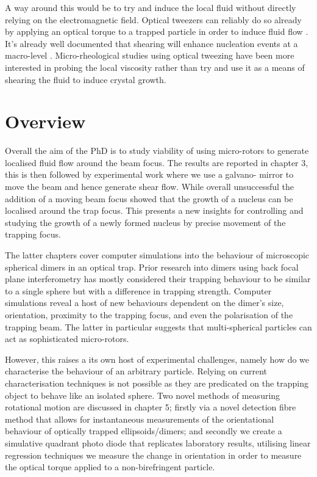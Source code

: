A way around this would be to try and induce the local fluid 
without directly relying on the electromagnetic field. Optical 
tweezers can reliably do so already by applying an optical 
torque to a trapped particle in order to induce fluid flow 
\cite{Bishop2004, RobertsonAnderson2018}. It's already well
documented that shearing will enhance nucleation events at a
macro-level \cite{Debuysschere2023}. Micro-rheological studies 
using optical tweezing have been more interested in probing 
the local viscosity rather than try and use it as a means of 
shearing the fluid to induce crystal growth. 

\section{Overview}
Overall the aim of the PhD is to study viability of using 
micro-rotors to generate localised fluid flow around the 
beam focus. The results are reported in chapter 3, this is 
then followed by experimental work where we use a galvano-
mirror to move the beam and hence generate shear flow. While 
overall unsuccessful the addition of a moving beam focus 
showed that the growth of a nucleus can be localised around 
the trap focus. This presents a new insights for controlling 
and studying the growth of a newly formed nucleus by precise 
movement of the trapping focus.

The latter chapters cover computer simulations into the 
behaviour of microscopic spherical dimers in an optical
trap. Prior research into dimers using back focal plane
interferometry has mostly considered their trapping 
behaviour to be similar to a single sphere but with a 
difference in trapping strength. Computer simulations
reveal a host of new behaviours dependent on the dimer's
size, orientation, proximity to the trapping focus, and 
even the polarisation of the trapping beam. The latter in
particular suggests that multi-spherical particles can act
as sophisticated micro-rotors. 

However, this raises a its own host of experimental challenges,
namely how do we characterise the behaviour of an arbitrary
particle. Relying on current characterisation techniques is not
possible as they are predicated on the trapping object to behave
like an isolated sphere. Two novel methods of measuring rotational 
motion are discussed in chapter 5; firstly via a novel detection 
fibre method that allows for instantaneous measurements of the 
orientational behaviour of optically trapped ellipsoids/dimers; 
and secondly we create a simulative quadrant photo diode that 
replicates laboratory results, utilising linear regression 
techniques we measure the change in orientation in order to 
measure the optical torque applied to a non-birefringent particle. 
